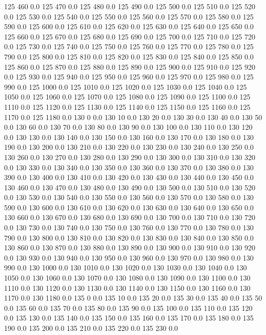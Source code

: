 125	460	0.0
125	470	0.0
125	480	0.0
125	490	0.0
125	500	0.0
125	510	0.0
125	520	0.0
125	530	0.0
125	540	0.0
125	550	0.0
125	560	0.0
125	570	0.0
125	580	0.0
125	590	0.0
125	600	0.0
125	610	0.0
125	620	0.0
125	630	0.0
125	640	0.0
125	650	0.0
125	660	0.0
125	670	0.0
125	680	0.0
125	690	0.0
125	700	0.0
125	710	0.0
125	720	0.0
125	730	0.0
125	740	0.0
125	750	0.0
125	760	0.0
125	770	0.0
125	780	0.0
125	790	0.0
125	800	0.0
125	810	0.0
125	820	0.0
125	830	0.0
125	840	0.0
125	850	0.0
125	860	0.0
125	870	0.0
125	880	0.0
125	890	0.0
125	900	0.0
125	910	0.0
125	920	0.0
125	930	0.0
125	940	0.0
125	950	0.0
125	960	0.0
125	970	0.0
125	980	0.0
125	990	0.0
125	1000	0.0
125	1010	0.0
125	1020	0.0
125	1030	0.0
125	1040	0.0
125	1050	0.0
125	1060	0.0
125	1070	0.0
125	1080	0.0
125	1090	0.0
125	1100	0.0
125	1110	0.0
125	1120	0.0
125	1130	0.0
125	1140	0.0
125	1150	0.0
125	1160	0.0
125	1170	0.0
125	1180	0.0
130	0	0.0
130	10	0.0
130	20	0.0
130	30	0.0
130	40	0.0
130	50	0.0
130	60	0.0
130	70	0.0
130	80	0.0
130	90	0.0
130	100	0.0
130	110	0.0
130	120	0.0
130	130	0.0
130	140	0.0
130	150	0.0
130	160	0.0
130	170	0.0
130	180	0.0
130	190	0.0
130	200	0.0
130	210	0.0
130	220	0.0
130	230	0.0
130	240	0.0
130	250	0.0
130	260	0.0
130	270	0.0
130	280	0.0
130	290	0.0
130	300	0.0
130	310	0.0
130	320	0.0
130	330	0.0
130	340	0.0
130	350	0.0
130	360	0.0
130	370	0.0
130	380	0.0
130	390	0.0
130	400	0.0
130	410	0.0
130	420	0.0
130	430	0.0
130	440	0.0
130	450	0.0
130	460	0.0
130	470	0.0
130	480	0.0
130	490	0.0
130	500	0.0
130	510	0.0
130	520	0.0
130	530	0.0
130	540	0.0
130	550	0.0
130	560	0.0
130	570	0.0
130	580	0.0
130	590	0.0
130	600	0.0
130	610	0.0
130	620	0.0
130	630	0.0
130	640	0.0
130	650	0.0
130	660	0.0
130	670	0.0
130	680	0.0
130	690	0.0
130	700	0.0
130	710	0.0
130	720	0.0
130	730	0.0
130	740	0.0
130	750	0.0
130	760	0.0
130	770	0.0
130	780	0.0
130	790	0.0
130	800	0.0
130	810	0.0
130	820	0.0
130	830	0.0
130	840	0.0
130	850	0.0
130	860	0.0
130	870	0.0
130	880	0.0
130	890	0.0
130	900	0.0
130	910	0.0
130	920	0.0
130	930	0.0
130	940	0.0
130	950	0.0
130	960	0.0
130	970	0.0
130	980	0.0
130	990	0.0
130	1000	0.0
130	1010	0.0
130	1020	0.0
130	1030	0.0
130	1040	0.0
130	1050	0.0
130	1060	0.0
130	1070	0.0
130	1080	0.0
130	1090	0.0
130	1100	0.0
130	1110	0.0
130	1120	0.0
130	1130	0.0
130	1140	0.0
130	1150	0.0
130	1160	0.0
130	1170	0.0
130	1180	0.0
135	0	0.0
135	10	0.0
135	20	0.0
135	30	0.0
135	40	0.0
135	50	0.0
135	60	0.0
135	70	0.0
135	80	0.0
135	90	0.0
135	100	0.0
135	110	0.0
135	120	0.0
135	130	0.0
135	140	0.0
135	150	0.0
135	160	0.0
135	170	0.0
135	180	0.0
135	190	0.0
135	200	0.0
135	210	0.0
135	220	0.0
135	230	0.0
